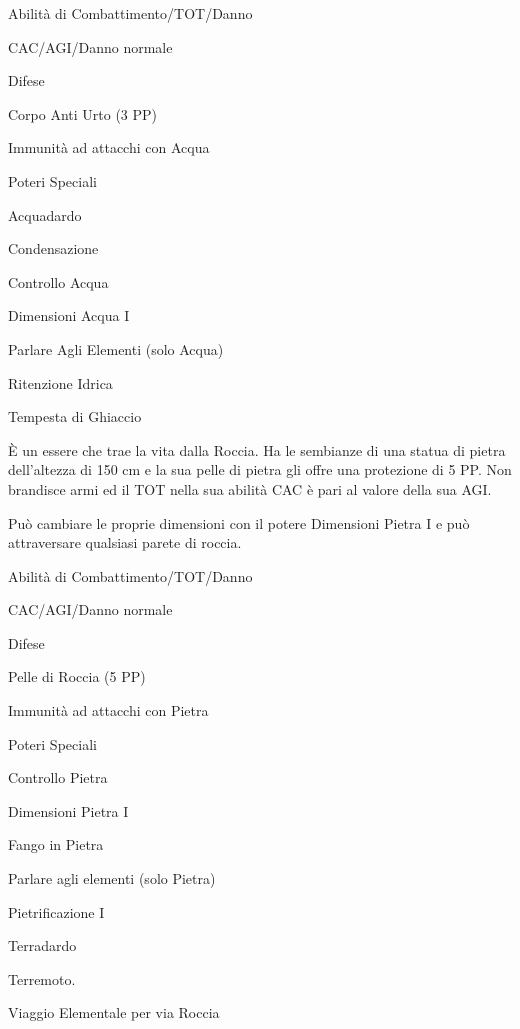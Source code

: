 \begin{parmostro}{Abilit\`a di Combattimento/TOT/Danno}
\item CAC/AGI/Danno normale
\end{parmostro}

\begin{parmostro}{Difese} 
\item Corpo Anti Urto (3 PP) 
\item Immunit\`a ad attacchi con Acqua
\end{parmostro}

\begin{parmostro}{Poteri Speciali} 
\item Acquadardo
\item Condensazione
\item Controllo Acqua
\item Dimensioni Acqua I
\item Parlare Agli Elementi (solo Acqua)
\item Ritenzione Idrica
\item Tempesta di Ghiaccio
\end{parmostro}


\`E un essere che trae la vita dalla Roccia. Ha le sembianze di una
statua di pietra dell'altezza di 150 cm e la sua pelle di pietra gli
offre una protezione di 5 PP. Non brandisce armi ed il TOT nella sua
abilit\`a CAC \`e pari al valore della sua AGI. 

Pu\`o cambiare le proprie dimensioni con il potere Dimensioni Pietra
I e pu\`o attraversare qualsiasi parete di roccia.


\begin{parmostro}{Abilit\`a di Combattimento/TOT/Danno}
\item CAC/AGI/Danno normale
\end{parmostro}

\begin{parmostro}{Difese}
\item Pelle di Roccia (5 PP)
\item Immunit\`a ad attacchi con Pietra
\end{parmostro}

\begin{parmostro}{Poteri Speciali} 
\item Controllo Pietra
\item Dimensioni Pietra I
\item Fango in Pietra
\item Parlare agli elementi (solo Pietra)
\item Pietrificazione I
\item Terradardo
\item Terremoto.
\item Viaggio Elementale per via Roccia
\end{parmostro}

